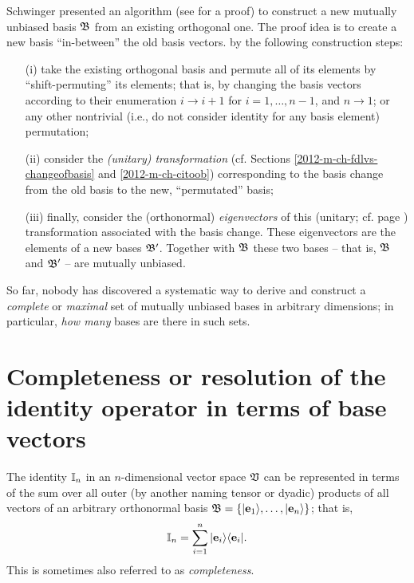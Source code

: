 Schwinger presented an algorithm (see \cite{Schwinger.60} for a proof)
to construct a new mutually unbiased basis ${\frak B}$   from an existing orthogonal one.
The proof idea
is to create a new basis ``in-between'' the old basis vectors.
by the following construction steps:
\begin{itemize}
\item[(i)]
take the existing orthogonal basis and permute all of its elements by ``shift-permuting'' its elements; that is, by
changing
the basis vectors according to their enumeration $i \rightarrow i+1$ for $i=1,\ldots , n-1$, and $n \rightarrow 1$;
or any other nontrivial (i.e., do not consider identity for any basis element) permutation;
\item[(ii)]
consider the {\em (unitary) transformation} (cf. Sections \ref{2012-m-ch-fdlvs-changeofbasis} and \ref{2012-m-ch-citoob})
corresponding to the basis change from the old basis to the new, ``permutated'' basis;
\item[(iii)]
finally, consider the (orthonormal) {\em eigenvectors} 
of this (unitary; cf. page
\pageref{2014-m-ch-fdvs-unitary}) transformation associated with the basis change.
These eigenvectors are the elements of a new bases  ${\frak B}'$.
Together with ${\frak B}$ these two bases
-- that is, ${\frak B}$ and ${\frak B}'$ --  are mutually unbiased.
\end{itemize}


So far, nobody  has discovered a systematic way to derive and construct a {\em complete} or {\em maximal}
set of mutually unbiased bases in arbitrary dimensions; in particular,
{\em how many} bases are there in such sets.


\section{Completeness or resolution of the identity operator in terms of base vectors}
\label{2016-m-ch-fdvsrotio}

The identity ${\Bbb I}_n$ in an $n$-dimensional vector space ${\frak V}$ can be represented in terms of the sum
over all outer (by another naming tensor or dyadic) products
of all vectors of an arbitrary orthonormal basis
${\frak B} =
\{
\vert {\bf e}_1 \rangle ,
\ldots ,
\vert{\bf e}_n \rangle
\}
$; that is,
\begin{equation}
 {\Bbb I}_n = \sum_{i=1}^n \vert {\bf e}_i \rangle \langle {\bf e}_i \vert
 .
\label{2016-m-ch-fdlws-roi}
\end{equation}
This is sometimes also referred to as {\em completeness}.

